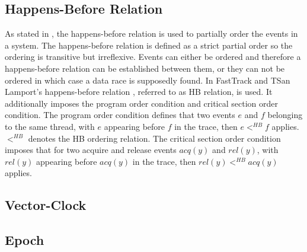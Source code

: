 \documentclass[12pt]{article}
\begin{document}
		\subsection{Happens-Before Relation}
		As stated in \cite[p. 4]{sulzmann2}, the happens-before relation is used to partially order the events in a system. The happens-before relation is defined as a strict partial order so the ordering is transitive but irreflexive. Events can either be ordered and therefore a happens-before relation can be established between them, or they can not be ordered in which case a data race is supposedly found. In FastTrack and TSan Lamport's happens-before relation \cite{lamport}, referred to as HB relation, is used. It additionally imposes the program order condition and critical section order condition. The program order condition defines that two events $e$ and $f$ belonging to the same thread, with $e$ appearing before $f$ in the trace, then $e <^{HB} f$ applies. $<^{HB}$ denotes the HB ordering relation. The critical section order condition imposes that for two acquire and release events $acq(y)$ and $rel(y)$, with $rel(y)$ appearing before $acq(y)$ in the trace, then $rel(y) <^{HB} acq(y)$ applies.
		\subsection{Vector-Clock}
		
		\subsection{Epoch}
%			
	
\end{document}
